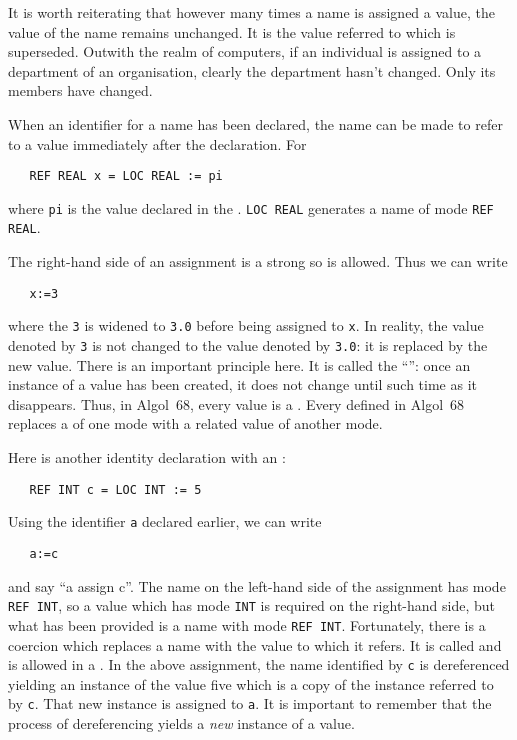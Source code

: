 It is worth reiterating that however many times a name is assigned a
value, the value of the name remains unchanged. It is the value
referred to which is superseded. Outwith the realm of computers, if
an individual is assigned to a department of an organisation, clearly
the department hasn't changed. Only its members have changed.

When an identifier for a name has been declared, the name can be made
to refer to a value immediately after the declaration.  For
\begin{verbatim}
   REF REAL x = LOC REAL := pi
\end{verbatim}
\noindent
where \verb|pi| is the value declared in the .
\verb|LOC REAL| generates a name of mode \verb|REF REAL|.

The right-hand side of an assignment is a strong
 so  is
allowed. Thus we can write
\begin{verbatim}
   x:=3
\end{verbatim}
\noindent
where the \verb|3| is widened to \verb|3.0| before being assigned to
\verb|x|. In reality, the value denoted by \verb|3| is not changed to
the value denoted by \verb|3.0|: it is replaced by the new value.
There is an important principle here. It is called the
``'':
once an
instance of a value has been created, it does not change until such
time as it disappears.  Thus, in Algol~68, every value is a
.  Every  defined in Algol~68
replaces a  of one mode with a related value of
another mode.
\newpage

Here is another identity declaration with an :
\begin{verbatim}
   REF INT c = LOC INT := 5
\end{verbatim}
\noindent
Using the identifier \verb|a| declared earlier, we can write
\begin{verbatim}
   a:=c
\end{verbatim}
\noindent
and say ``a assign c''. The name on the left-hand side of the
assignment has mode \verb|REF INT|, so a value which has mode
\verb|INT| is required on the right-hand side, but what has been
provided is a name with mode \verb|REF INT|. Fortunately, there is a
coercion which replaces a name with the value to which it refers. It
is called  and is
allowed in a .  In the above
assignment, the name identified by \verb|c| is dereferenced yielding
an instance of the value five which is a copy of the instance
referred to by \verb|c|.  That new instance is assigned to \verb|a|.
It is important to remember that the process of dereferencing yields
a \emph{new} instance of a value.

